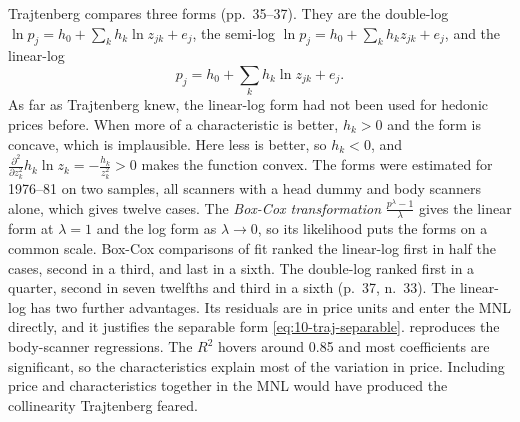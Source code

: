  Trajtenberg compares three forms (pp.~35--37). They are the double-log $\ln
p_j = h_0 + \sum_kh_k\ln z_{jk} + e_j$, the semi-log $\ln p_j = h_0 + \sum_kh_kz_{jk} + e_j$, and the linear-log
\begin{equation}\label{eq:10-traj-linearlog}
p_j = h_0 + \sum_k h_k\ln z_{jk} + e_j .
\end{equation}
As far as Trajtenberg knew, the linear-log form had not been used for hedonic prices before. When more of a characteristic is better, $h_k > 0$
and the form is concave, which is implausible. Here less is better, so $h_k < 0$, and $\frac{\partial^2}{\partial
z_k^2}h_k\ln z_k = -\frac{h_k}{z_k^2} > 0$ makes the function convex. The forms were estimated for 1976--81 on two
samples, all scanners with a head dummy and body scanners alone, which gives twelve cases. The \emph{Box-Cox
transformation} $\frac{p^\lambda - 1}{\lambda}$ gives the linear form at $\lambda = 1$ and the log form as
$\lambda\to 0$, so its likelihood puts the forms on a common scale. Box-Cox comparisons of fit ranked the linear-log first in half the cases, second in a third, and last in a sixth. The double-log ranked
first in a quarter, second in seven twelfths and third in a sixth (p.~37, n.~33). The linear-log has two further
advantages. Its residuals are in price units and enter the MNL directly, and it justifies the separable form
\eqref{eq:10-traj-separable}.  reproduces the body-scanner regressions. The $R^2$ hovers
around 0.85 and most coefficients are significant, so the characteristics explain most of the variation in price.
Including price and characteristics together in the MNL would have produced the collinearity Trajtenberg feared.


